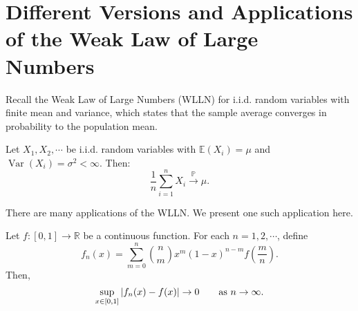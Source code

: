 \documentclass{huhtakm-template-book-v2}
\newcommand{\prob}{\mathbb{P}}
\newcommand{\expect}{\mathbb{E}}
\DeclareMathOperator{\Var}{Var}
\begin{document}
\section{Different Versions and Applications of the Weak Law of Large Numbers}
    Recall the Weak Law of Large Numbers (WLLN) for i.i.d. random variables with finite mean and variance, which states that the sample average converges in probability to the population mean.
    \begin{thm}
        Let $X_{1},X_{2},\cdots$ be i.i.d. random variables with $\expect(X_{i}) = \mu$ and $\Var(X_{i}) = \sigma^{2} < \infty$. Then:
        \begin{equation*}
            \frac{1}{n}\sum_{i = 1}^{n}X_{i} \xrightarrow{\prob} \mu.
        \end{equation*}
    \end{thm}
    There are many applications of the WLLN. We present one such application here.
    \begin{eg}
        Let $f:[0,1] \to \mathbb{R}$ be a continuous function. For each $n = 1,2,\cdots$, define
        \begin{equation*}
            \tag{Bernstein Polynomial}
            f_{n}(x) = \sum_{m = 0}^{n}\binom{n}{m}x^{m}(1-x)^{n-m}f\left(\frac{m}{n}\right).
        \end{equation*}
        Then,
        \begin{equation*}
            \sup_{x \in [0,1]}\left|{f_{n}(x)-f(x)}\right| \to 0 \qquad\text{as } n \to \infty.
        \end{equation*}
    \end{eg}
\end{document}
